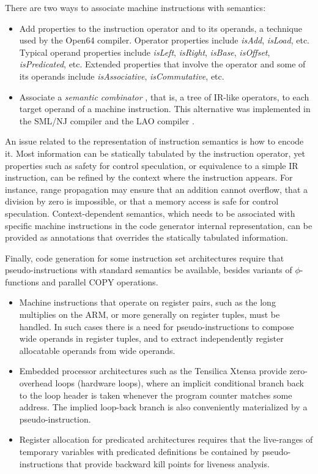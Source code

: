 There are two ways to associate machine instructions with semantics: \begin{itemize}

\item Add properties to the instruction operator and to
its operands, a technique used by the Open64 compiler. Operator properties
include \emph{isAdd}, \emph{isLoad}, etc. Typical operand properties include
\emph{isLeft}, \emph{isRight}, \emph{isBase}, \emph{isOffset},
\emph{isPredicated}, etc. Extended properties that involve the operator and some
of its operands include \emph{isAssociative}, \emph{isCommutative}, etc.  \item
Associate a \emph{semantic combinator} \cite{Wand:1983:IC}, that is, a tree of IR-like operators, to
each target operand of a machine instruction. This alternative
was implemented in the SML/NJ \cite{Leung:1999:PLDI} compiler and the LAO
compiler \cite{Dinechin:2000:CASES}.  \end{itemize}

An issue related to the representation of instruction semantics is how to
encode it. Most information can be statically tabulated by the instruction
operator, yet properties such as safety for control speculation, or equivalence
to a simple IR instruction, can be refined by the context where the instruction
appears. For instance, range propagation may ensure that an addition cannot
overflow, that a division by zero is impossible, or that a memory access is
safe for control speculation. Context-dependent semantics, which needs to be
associated with specific machine instructions in the code generator internal
representation, can be provided as annotations that overrides the statically
tabulated information.

Finally, code generation for some instruction set architectures require that
pseudo-instructions with standard semantics be available, besides variants of
$\phi$-functions and parallel COPY operations. \begin{itemize}

\item Machine instructions that operate on register pairs, such as the long
multiplies on the ARM, or more generally on register tuples, must be handled. In such
cases there is a need for pseudo-instructions to compose wide operands in
register tuples, and to extract independently register allocatable operands from
wide operands.

\item Embedded processor architectures such as the Tensilica Xtensa
\cite{Gonzalez:2000:IEEEMicro} provide zero-overhead loops (hardware
loops), where an implicit conditional branch back to the loop header is taken
whenever the program counter matches some address. The implied loop-back branch
is also conveniently materialized by a pseudo-instruction.

\item Register allocation for predicated architectures requires that the live-ranges
of temporary variables with predicated definitions be contained by
pseudo-instructions \cite{Gillies:1996:MICRO} that provide backward kill points for liveness analysis.

\end{itemize}

